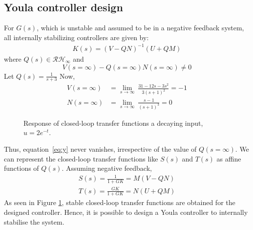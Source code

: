 \subsection{Youla controller design}
For $G(s)$, which is unstable and assumed to be in a negative feedback system, all internally stabilizing controllers are given by:\\
\begin{align*}
    K(s) = (V-QN)^{-1}(U+QM)
\end{align*}
where $Q(s) \in \mathcal{RH}_{\infty}$ and
\begin{equation}
    V(s=\infty)-Q(s=\infty)N(s=\infty) \neq 0
\label{eq:y}
\end{equation}
Let $Q(s) = \frac{1}{s+3}$
Now,
\begin{align*}
V(s=\infty) &= \lim_{s\to\infty}\: \frac{31-12s-3s^2}{3(s+1)^2} = -1\\
N(s=\infty) &= \lim_{s\to\infty}\: \frac{s-1}{(s+1)^3} = 0
\end{align*}
\begin{figure}[h!]
    \centering
    \scalebox{0.7}{
    \begin{tikzpicture}
        
    \end{tikzpicture}}
    \caption{Response of closed-loop transfer functions a decaying input, $u = 2e^{-t}$.}
    \label{fig:stres}
\end{figure}
Thus, equation~\eqref{eq:y} never vanishes, irrespective of the value of $Q(s=\infty)$.
We can represent the closed-loop transfer functions like $S(s)$ and $T(s)$ as affine functions of $Q(s)$. Assuming negative feedback,
\begin{align*}
    S(s) = \frac{1}{1 + GK} = M(V-QN)\\
    T(s) = \frac{GK}{1+GK} = N(U+QM)
\end{align*}
As seen in Figure \ref{fig:stres}, stable closed-loop transfer functions are obtained for the designed controller. Hence, it is possible to design a Youla controller to internally stabilise the system.